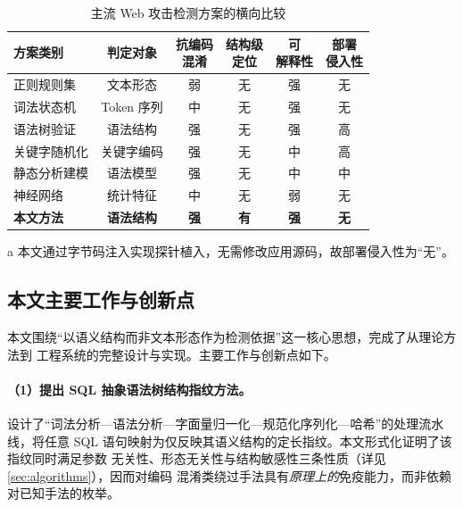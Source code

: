 \begin{table}[htbp]
\centering
\caption{主流 Web 攻击检测方案的横向比较}
\label{tab:related-work}
\small
\begin{threeparttable}
\begin{tabular}{@{}l c c c c c@{}}
\toprule
\textbf{方案类别} & \textbf{判定对象} & \makecell{\textbf{抗编码}\\\textbf{混淆}} &
\makecell{\textbf{结构级}\\\textbf{定位}} & \makecell{\textbf{可}\\\textbf{解释性}} &
\makecell{\textbf{部署}\\\textbf{侵入性}} \\
\midrule
正则规则集\cite{owasp2023crs}        & 文本形态   & 弱   & 无 & 强 & 无 \\
词法状态机\cite{galbreath2012libinjection} & Token 序列 & 中   & 无 & 强 & 无 \\
语法树验证\cite{buehrer2005sqlguard} & 语法结构   & 强   & 无 & 强 & 高 \\
关键字随机化\cite{boyd2004sqlrand}   & 关键字编码 & 强   & 无 & 中 & 高 \\
静态分析建模\cite{halfond2006amnesia}& 语法模型   & 强   & 无 & 中 & 中 \\
神经网络\cite{tang2020detection}     & 统计特征   & 中   & 无 & 弱 & 无 \\
\midrule
\textbf{本文方法}                    & \textbf{语法结构} & \textbf{强} &
\textbf{有} & \textbf{强} & \textbf{无}\tnote{a} \\
\bottomrule
\end{tabular}
\begin{tablenotes}[flushleft]\footnotesize
\item[a] 本文通过字节码注入实现探针植入，无需修改应用源码，故部署侵入性为“无”。
\end{tablenotes}
\end{threeparttable}
\end{table}

\subsection{本文主要工作与创新点}

本文围绕“以语义结构而非文本形态作为检测依据”这一核心思想，完成了从理论方法到
工程系统的完整设计与实现。主要工作与创新点如下。

\paragraph{（1）提出 SQL 抽象语法树结构指纹方法。}
设计了“词法分析—语法分析—字面量归一化—规范化序列化—哈希”的处理流水线，将任意
SQL 语句映射为仅反映其语义结构的定长指纹。本文形式化证明了该指纹同时满足参数
无关性、形态无关性与结构敏感性三条性质（详见\cref{sec:algorithms}），因而对编码
混淆类绕过手法具有\emph{原理上的}免疫能力，而非依赖对已知手法的枚举。

